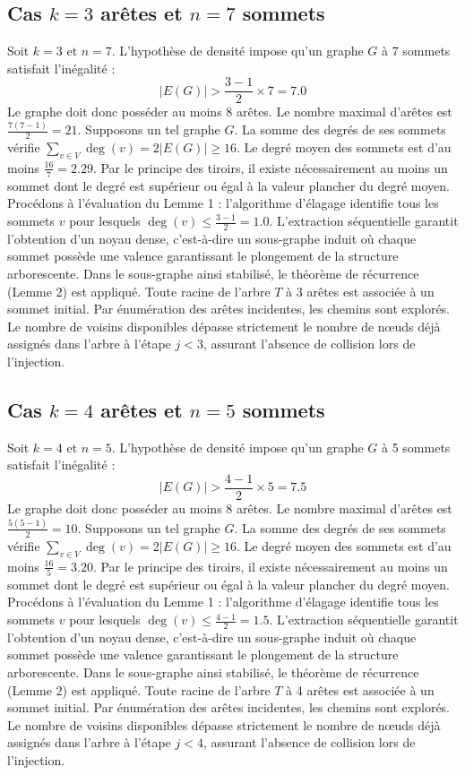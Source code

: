 \documentclass[12pt,a4paper]{article}
\begin{document}
\subsection{Cas $k = 3$ arêtes et $n = 7$ sommets}
Soit $k = 3$ et $n = 7$. L'hypothèse de densité impose qu'un graphe $G$ à 7 sommets satisfait l'inégalité :
$$ |E(G)| > \frac{3-1}{2} \times 7 = 7.0 $$
Le graphe doit donc posséder au moins $8$ arêtes. Le nombre maximal d'arêtes est $\frac{7(7-1)}{2} = 21$.
Supposons un tel graphe $G$. La somme des degrés de ses sommets vérifie $\sum_{v \in V} \deg(v) = 2|E(G)| \geq 16$.
Le degré moyen des sommets est d'au moins $\frac{16}{7} = 2.29$.
Par le principe des tiroirs, il existe nécessairement au moins un sommet dont le degré est supérieur ou égal à la valeur plancher du degré moyen.
Procédons à l'évaluation du Lemme 1 : l'algorithme d'élagage identifie tous les sommets $v$ pour lesquels $\deg(v) \leq \frac{3-1}{2} = 1.0$.
L'extraction séquentielle garantit l'obtention d'un noyau dense, c'est-à-dire un sous-graphe induit où chaque sommet possède une valence garantissant le plongement de la structure arborescente.
Dans le sous-graphe ainsi stabilisé, le théorème de récurrence (Lemme 2) est appliqué. Toute racine de l'arbre $T$ à 3 arêtes est associée à un sommet initial. Par énumération des arêtes incidentes, les chemins sont explorés. Le nombre de voisins disponibles dépasse strictement le nombre de nœuds déjà assignés dans l'arbre à l'étape $j < 3$, assurant l'absence de collision lors de l'injection.

\subsection{Cas $k = 4$ arêtes et $n = 5$ sommets}
Soit $k = 4$ et $n = 5$. L'hypothèse de densité impose qu'un graphe $G$ à 5 sommets satisfait l'inégalité :
$$ |E(G)| > \frac{4-1}{2} \times 5 = 7.5 $$
Le graphe doit donc posséder au moins $8$ arêtes. Le nombre maximal d'arêtes est $\frac{5(5-1)}{2} = 10$.
Supposons un tel graphe $G$. La somme des degrés de ses sommets vérifie $\sum_{v \in V} \deg(v) = 2|E(G)| \geq 16$.
Le degré moyen des sommets est d'au moins $\frac{16}{5} = 3.20$.
Par le principe des tiroirs, il existe nécessairement au moins un sommet dont le degré est supérieur ou égal à la valeur plancher du degré moyen.
Procédons à l'évaluation du Lemme 1 : l'algorithme d'élagage identifie tous les sommets $v$ pour lesquels $\deg(v) \leq \frac{4-1}{2} = 1.5$.
L'extraction séquentielle garantit l'obtention d'un noyau dense, c'est-à-dire un sous-graphe induit où chaque sommet possède une valence garantissant le plongement de la structure arborescente.
Dans le sous-graphe ainsi stabilisé, le théorème de récurrence (Lemme 2) est appliqué. Toute racine de l'arbre $T$ à 4 arêtes est associée à un sommet initial. Par énumération des arêtes incidentes, les chemins sont explorés. Le nombre de voisins disponibles dépasse strictement le nombre de nœuds déjà assignés dans l'arbre à l'étape $j < 4$, assurant l'absence de collision lors de l'injection.
\end{document}
